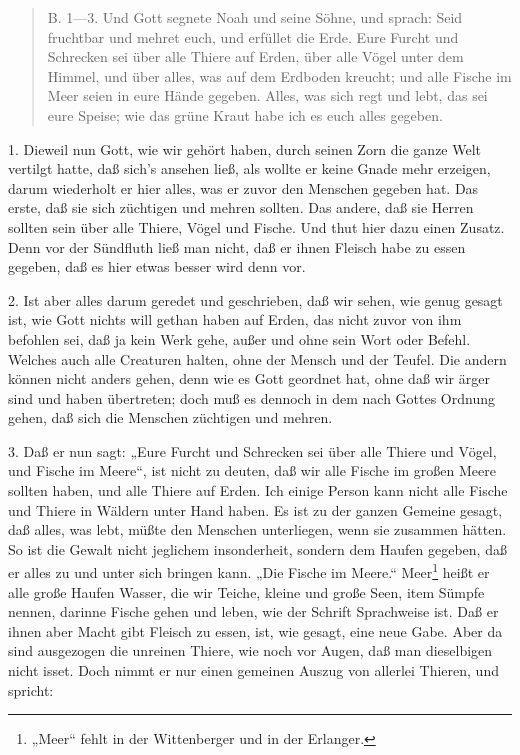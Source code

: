 \begin{quote}
B. 1—3. Und Gott segnete Noah und seine Söhne, und sprach: Seid fruchtbar und mehret euch, und erfüllet die Erde. Eure Furcht und Schrecken sei über alle Thiere auf Erden, über alle Vögel unter dem Himmel, und über alles, was auf dem Erdboden kreucht; und alle Fische im Meer seien in eure Hände gegeben. Alles, was sich regt und lebt, das sei eure Speise; wie das grüne Kraut habe ich es euch alles gegeben.
\end{quote}

1. Dieweil nun Gott, wie wir gehört haben, durch seinen Zorn die ganze Welt vertilgt hatte, daß sich's ansehen ließ, als wollte er keine Gnade mehr erzeigen, darum wiederholt er hier alles, was er zuvor den Menschen gegeben hat. Das erste, daß sie sich züchtigen und mehren sollten. Das andere, daß sie Herren sollten sein über alle Thiere, Vögel und Fische. Und thut hier dazu einen Zusatz. Denn vor der Sündfluth ließ man nicht, daß er ihnen Fleisch habe zu essen gegeben, daß es hier etwas besser wird denn vor.

2. Ist aber alles darum geredet und geschrieben, daß wir sehen, wie genug gesagt ist, wie Gott nichts will gethan haben auf Erden, das nicht zuvor von ihm befohlen sei, daß ja kein Werk gehe, außer und ohne sein Wort oder Befehl. Welches auch alle Creaturen halten, ohne der Mensch und der Teufel. Die andern können nicht anders gehen, denn wie es Gott geordnet hat, ohne daß wir ärger sind und haben übertreten; doch muß es dennoch in dem nach Gottes Ordnung gehen, daß sich die Menschen züchtigen und mehren.

3. Daß er nun sagt: „Eure Furcht und Schrecken sei über alle Thiere und Vögel, und Fische im Meere“, ist nicht zu deuten, daß wir alle Fische im großen Meere sollten haben, und alle Thiere auf Erden. Ich einige Person kann nicht alle Fische und Thiere in Wäldern unter Hand haben. Es ist zu der ganzen Gemeine gesagt, daß alles, was lebt, müßte den Menschen unterliegen, wenn sie zusammen hätten. So ist die Gewalt nicht jeglichem insonderheit, sondern dem Haufen gegeben, daß er alles zu und unter sich bringen kann. „Die Fische im Meere.“ Meer\footnote{„Meer“ fehlt in der Wittenberger und in der Erlanger.} heißt er alle große Haufen Wasser, die wir Teiche, kleine und große Seen, item Sümpfe nennen, darinne Fische gehen und leben, wie der Schrift Sprachweise ist. Daß er ihnen aber Macht gibt Fleisch zu essen, ist, wie gesagt, eine neue Gabe. Aber da sind ausgezogen die unreinen Thiere, wie noch vor Augen, daß man
dieselbigen nicht isset. Doch nimmt er nur einen gemeinen Auszug von allerlei Thieren, und spricht:

